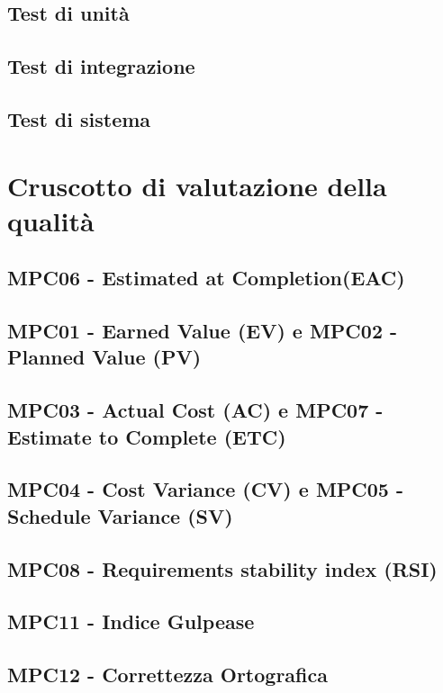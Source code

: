 \documentclass[italian,12pt]{article} %
\begin{document}
\subsection{Test di unità}

\subsection{Test di integrazione}

\subsection{Test di sistema}

\section{Cruscotto di valutazione della qualità}

\subsection{MPC06 - Estimated at Completion(EAC)}

\subsection{MPC01 - Earned Value (EV) e MPC02 - Planned Value (PV)}

\subsection{MPC03 - Actual Cost (AC) e MPC07 - Estimate to Complete (ETC)}

\subsection{MPC04 - Cost Variance (CV) e MPC05 - Schedule Variance (SV)}

\subsection{MPC08 - Requirements stability index (RSI)}

\subsection{MPC11 - Indice Gulpease}

\subsection{MPC12 - Correttezza Ortografica}
\end{document}
